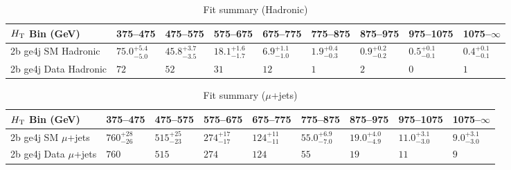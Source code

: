 \documentclass[8pt]{article}
\def\scalht{\mbox{$H_{\rm{T}}$}\xspace}
\newcommand\T{\rule{0pt}{2.6ex}}
\begin{document}
\begin{table}[ht!]
\caption{Fit summary (Hadronic)}
\label{tab:ensemble-summary}
\centering
\begin{tabular}{ lllllllll }

\hline
\scalht Bin (GeV)       & 375--475                       & 475--575                       & 575--675                       & 675--775                       & 775--875                       & 875--975                       & 975--1075                      & 1075--$\infty$                 \\ [1.000000ex]
\hline
2b ge4j SM Hadronic\T   & $75.0^{+5.4}_{-5.0}$           & $45.8^{+3.7}_{-3.5}$           & $18.1^{+1.6}_{-1.7}$           & $6.9^{+1.1}_{-1.0}$            & $1.9^{+0.4}_{-0.3}$            & $0.9^{+0.2}_{-0.2}$            & $0.5^{+0.1}_{-0.1}$            & $0.4^{+0.1}_{-0.1}$            \\ 
2b ge4j Data Hadronic\T & $72$                           & $52$                           & $31$                           & $12$                           & $1$                            & $2$                            & $0$                            & $1$                            \\ 
\hline

\end{tabular}
\end{table}
\begin{table}[ht!]
\caption{Fit summary ($\mu$+jets)}
\label{tab:ensemble-summary}
\centering
\begin{tabular}{ lllllllll }

\hline
\scalht Bin (GeV)       & 375--475                       & 475--575                       & 575--675                       & 675--775                       & 775--875                       & 875--975                       & 975--1075                      & 1075--$\infty$                 \\ [1.000000ex]
\hline
2b ge4j SM $\mu$+jets\T & $760^{+28}_{-26}$              & $515^{+25}_{-23}$              & $274^{+17}_{-17}$              & $124^{+11}_{-11}$              & $55.0^{+6.9}_{-7.0}$           & $19.0^{+4.0}_{-4.9}$           & $11.0^{+3.1}_{-3.0}$           & $9.0^{+3.1}_{-3.0}$            \\ 
2b ge4j Data $\mu$+jets\T & $760$                          & $515$                          & $274$                          & $124$                          & $55$                           & $19$                           & $11$                           & $9$                            \\ 
\hline

\end{tabular}
\end{table}
\end{document}
